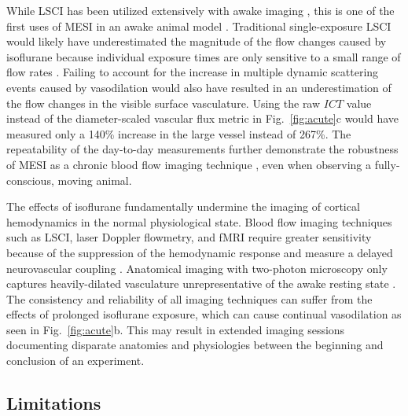 \documentclass[12pt]{spieman}
\begin{document}
\begin{spacing}{2}
While LSCI has been utilized extensively with awake imaging \cite{Takuwa:2011jr,Seto:2014ga,Lu:2017bo,Balbi:2017cj,Sunil:2020ac}, this is one of the first uses of MESI in an awake animal model \cite{He:2020}. Traditional single-exposure LSCI would likely have underestimated the magnitude of the flow changes caused by isoflurane because individual exposure times are only sensitive to a small range of flow rates \cite{Parthasarathy:2008el}. Failing to account for the increase in multiple dynamic scattering events caused by vasodilation would also have resulted in an underestimation of the flow changes in the visible surface vasculature. Using the raw $ICT$ value instead of the diameter-scaled vascular flux metric in Fig.~\ref{fig:acute}c would have measured only a 140\% increase in the large vessel instead of 267\%. The repeatability of the day-to-day measurements further demonstrate the robustness of MESI as a chronic blood flow imaging technique \cite{Kazmi:2013hp}, even when observing a fully-conscious, moving animal.

The effects of isoflurane fundamentally undermine the imaging of cortical hemodynamics in the normal physiological state. Blood flow imaging techniques such as LSCI, laser Doppler flowmetry, and fMRI require greater sensitivity because of the suppression of the hemodynamic response \cite{Takuwa:2012ee} and measure a delayed neurovascular coupling \cite{Pisauro:2013cx}. Anatomical imaging with two-photon microscopy only captures heavily-dilated vasculature unrepresentative of the awake resting state \cite{Lyons:2016bd}. The consistency and reliability of all imaging techniques can suffer from the effects of prolonged isoflurane exposure, which can cause continual vasodilation as seen in Fig.~\ref{fig:acute}b. This may result in extended imaging sessions documenting disparate anatomies and physiologies between the beginning and conclusion of an experiment.



\subsection{Limitations}


\end{spacing}
\end{document}
